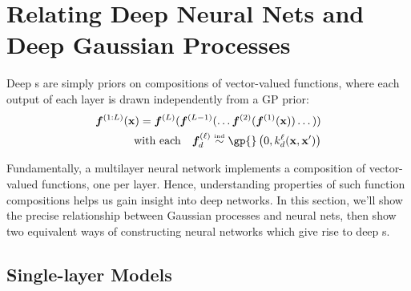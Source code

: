 \section{Relating Deep Neural Nets and Deep Gaussian Processes}
\label{sec:relating}



Deep \gp{}s are simply priors on compositions of vector-valued functions, where each output of each layer is drawn independently from a GP prior:
%
\begin{align}
\vf^{(1:L)}(\vx) = \vf^{(L)}(\vf^{(L-1)}(\dots \vf^{(2)}(\vf^{(1)}(\vx)) \dots)) \\
\textnormal{with each} \quad \vf_d^{(\layerindex)}  \simind \gp{} \left( 0, k^\layerindex_d(\vx, \vx') \right) \nonumber
\label{eq:deep-gp}
\end{align}
%

Fundamentally, a multilayer neural network implements a composition of vector-valued functions, one per layer.
Hence, understanding properties of such function compositions helps us gain insight into deep networks.
In this section, we'll show the precise relationship between Gaussian processes and neural nets, then show two equivalent ways of constructing neural networks which give rise to deep \gp{}s.



\subsection{Single-layer Models}

